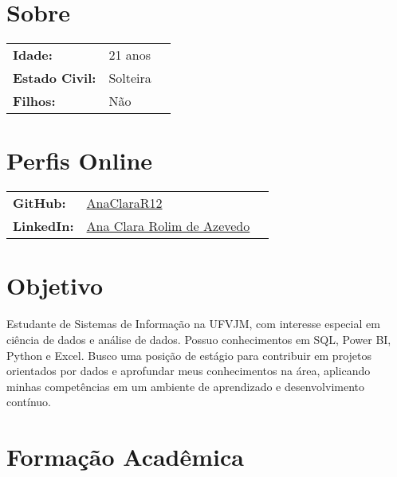 \documentclass[11pt,a4paper]{moderncv} %
\begin{document}
\maketitle %


\section{Sobre}
\begin{tabular}{@{}lll} %
    \textbf{Idade:} & 21 anos & \\
    \textbf{Estado Civil: } & Solteira & \\
    \textbf{Filhos:} & Não & \\
\end{tabular}

\section{Perfis Online}
\begin{tabular}{@{}lll}
    \textbf{GitHub:} & \hspace{0.75cm}\href{https://github.com/AnaClaraR12}{AnaClaraR12} & \\
    \textbf{LinkedIn:} & \hspace{0.75cm}\href{https://www.linkedin.com/in/ana-clara-rolim-de-azevedo-450789334}{Ana Clara Rolim de Azevedo} & \\
\end{tabular}
\section{Objetivo}
\justify Estudante de Sistemas de Informação na UFVJM, com interesse especial em ciência de dados e análise de dados. Possuo conhecimentos em SQL, Power BI, Python e Excel. Busco uma posição de estágio para contribuir em projetos orientados por dados e aprofundar meus conhecimentos na área, aplicando minhas competências em um ambiente de aprendizado e desenvolvimento contínuo.


\section{Formação Acadêmica}
\end{document}
